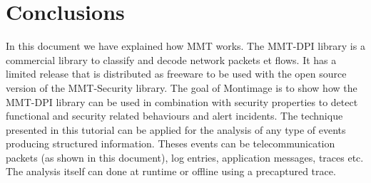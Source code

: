 \clearpage

\section{Conclusions}
\label{Conclusions}

In this document we have explained how MMT works. The MMT-DPI library is a commercial library to classify and decode network packets et flows. It has a limited release that is distributed as freeware to be used with the open source version of the MMT-Security library. The goal of Montimage is to show how the MMT-DPI library can be used in combination with security properties to detect  functional and security related behaviours and alert incidents. The technique presented in this tutorial can be applied for the analysis of any type of events producing structured information. Theses events can be telecommunication packets (as shown in this document), log entries, application messages, traces etc. The analysis itself can done at runtime or offline using a precaptured trace.    






